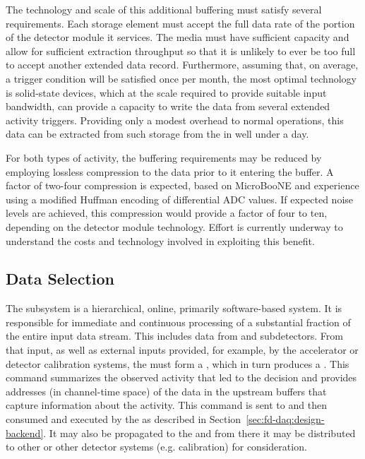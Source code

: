 The technology and scale of this additional buffering must satisfy several requirements. 
Each storage element must accept the full data rate of the portion of the detector module it services.
The media must have sufficient capacity and allow for sufficient
extraction throughput so that it is unlikely 
to ever be too full to accept another extended data record. 
Furthermore, assuming that, on average, a  trigger condition will be
satisfied once per month, the most optimal technology is
solid-state  devices, which at the scale required to provide suitable input bandwidth, can provide a capacity to write the data from several extended activity triggers.
Providing only a modest overhead to normal operations, this data can
be extracted from such storage from the  in well under a day.

For both types of activity, the buffering requirements may be reduced by employing lossless compression to the data prior to it entering the buffer.
A factor of two-four compression is expected, based on MicroBooNE and  experience using a modified Huffman encoding of differential ADC values. 
If expected noise levels are achieved, this compression would provide a factor of four to ten, depending on the detector module technology.
Effort is currently underway to understand the costs and technology involved in exploiting this benefit.

\subsection{Data Selection}
\label{sec:sp-daq:design-data-selection}

The  subsystem is a hierarchical, online, primarily
software-based system. It is responsible for immediate and continuous processing of a substantial fraction of the entire input data stream. 
This includes data from  and  subdetectors.
From that input, as well as external inputs provided, for example, by
the accelerator or detector calibration systems, the  must form a ,
which in turn produces a .
This command summarizes the observed activity that led to the decision
and provides addresses (in channel-time space) of the data in the
upstream  buffers that capture information about the activity.
This command is sent to and then consumed and executed by the  as described in Section~\ref{sec:fd-daq:design-backend}. 
It may also be propagated to the  and from there it may be
distributed to other  or other detector systems
(e.g. calibration) for consideration.


